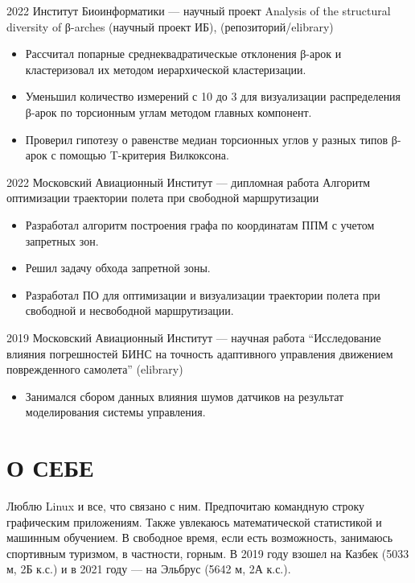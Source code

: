 \documentclass[9pt]{article}
\begin{document}
    \project
    {2022}
    {Институт Биоинформатики — научный проект}
    {Analysis of the structural diversity of β-arches (научный проект ИБ), (репозиторий/elibrary)}
    {
        \begin{itemize}
            \setlength\itemsep{-.5em}
            \item Рассчитал попарные среднеквадратическые отклонения β-арок и кластеризовал их методом иерархической кластеризации.
            \item Уменьшил количество измерений с 10 до 3 для визуализации распределения β-арок по торсионным углам методом главных компонент.
            \item Проверил гипотезу о равенстве медиан торсионных углов у разных типов β-арок с помощью T-критерия Вилкоксона.
        \end{itemize}
    }
    
    \project
    {2022}
    {Московский Авиационный Институт — дипломная работа}
    {Алгоритм оптимизации траектории полета при свободной маршрутизации}
    {
        \begin{itemize}
            \setlength\itemsep{-.5em}
            \item Разработал алгоритм построения графа по координатам ППМ с учетом запретных зон.
            \item Решил задачу обхода запретной зоны.
            \item Разработал ПО для оптимизации и визуализации траектории полета при свободной и несвободной маршрутизации.
        \end{itemize}
    }
    
    \project
    {2019}
    {Московский Авиационный Институт — научная работа}
    {“Исследование влияния погрешностей БИНС на точность адаптивного управления движением поврежденного самолета” (elibrary)}
    {
        \begin{itemize}
            \setlength\itemsep{-.5em}
            \item Занимался сбором данных влияния шумов датчиков на результат моделирования системы управления.
        \end{itemize}
    }


\section{О СЕБЕ}

    Люблю Linux и все, что связано с ним. Предпочитаю командную строку графическим приложениям.
    Также увлекаюсь математической статистикой и машинным обучением.
    В свободное время, если есть возможность, занимаюсь спортивным туризмом, в частности, горным. В 2019 году
    взошел на Казбек (5033 м, 2Б к.с.) и в 2021 году — на Эльбрус (5642 м, 2А к.с.).
\end{document}
